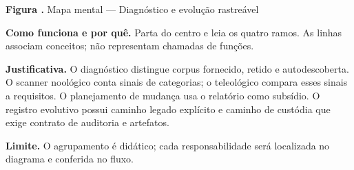 {\small\textbf{Figura \thefigure.} Mapa mental --- Diagnóstico e evolução rastreável}\par\smallskip
\noindent\textbf{Como funciona e por quê.} Parta do centro e leia os quatro ramos. As linhas associam conceitos; não representam chamadas de funções.\par
\noindent\textbf{Justificativa.} O diagnóstico distingue corpus fornecido, retido e autodescoberta. O scanner noológico conta sinais de categorias; o teleológico compara esses sinais a requisitos. O planejamento de mudança usa o relatório como subsídio. O registro evolutivo possui caminho legado explícito e caminho de custódia que exige contrato de auditoria e artefatos.\par
\noindent\textbf{Limite.} O agrupamento é didático; cada responsabilidade será localizada no diagrama e conferida no fluxo.\par\smallskip
{}
